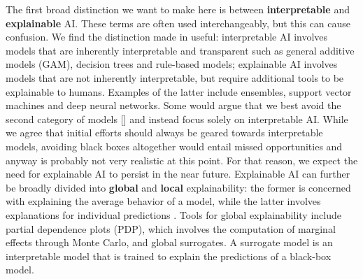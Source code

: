 \documentclass[
  letterpaper,
  DIV=11,
  numbers=noendperiod]{scrartcl}
\begin{document}
The first broad distinction we want to make here is between
\textbf{interpretable} and \textbf{explainable} AI. These terms are
often used interchangeably, but this can cause confusion. We find the
distinction made in \cite{rudin2019stop} useful: interpretable AI
involves models that are inherently interpretable and transparent such
as general additive models (GAM), decision trees and rule-based models;
explainable AI involves models that are not inherently interpretable,
but require additional tools to be explainable to humans. Examples of
the latter include ensembles, support vector machines and deep neural
networks. Some would argue that we best avoid the second category of
models {[}\cite{rudin2019stop}{]} and instead focus solely on
interpretable AI. While we agree that initial efforts should always be
geared towards interpretable models, avoiding black boxes altogether
would entail missed opportunities and anyway is probably not very
realistic at this point. For that reason, we expect the need for
explainable AI to persist in the near future. Explainable AI can further
be broadly divided into \textbf{global} and \textbf{local}
explainability: the former is concerned with explaining the average
behavior of a model, while the latter involves explanations for
individual predictions \cite{molnar2020interpretable}. Tools for global
explainability include partial dependence plots (PDP), which involves
the computation of marginal effects through Monte Carlo, and global
surrogates. A surrogate model is an interpretable model that is trained
to explain the predictions of a black-box model.
\end{document}
